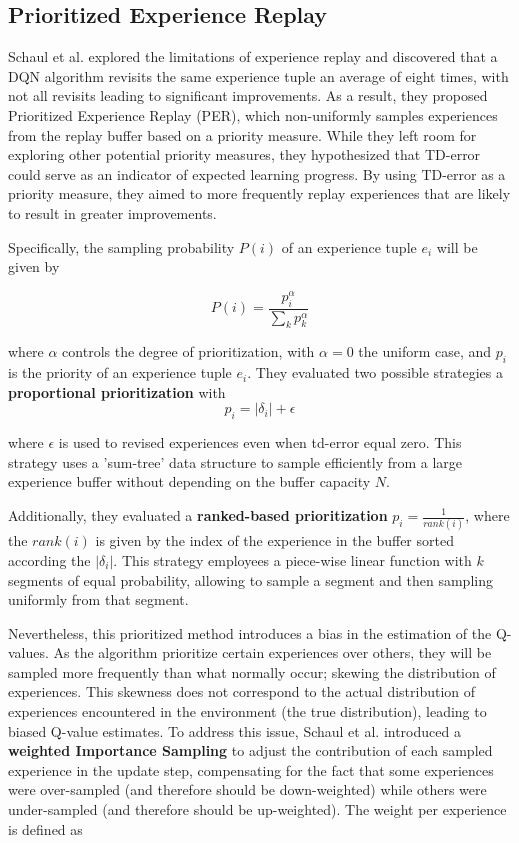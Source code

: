 \subsection{Prioritized Experience Replay}

Schaul et al. \cite{schaul2015prioritized} explored the limitations of experience replay and discovered that a DQN algorithm revisits the same experience tuple an average of eight times, with not all revisits leading to significant improvements. As a result, they proposed Prioritized Experience Replay (PER), which non-uniformly samples experiences from the replay buffer based on a priority measure. While they left room for exploring other potential priority measures, they hypothesized that TD-error could serve as an indicator of expected learning progress. By using TD-error as a priority measure, they aimed to more frequently replay experiences that are likely to result in greater improvements.

Specifically, the sampling probability $P(i)$ of an experience tuple $e_i$ will be given by

\begin{equation}
    P(i) = \frac{p_i^\alpha}{\sum_k p_k^\alpha}
\end{equation}

where $\alpha$ controls the degree of prioritization, with $\alpha = 0$ the uniform case, and $p_i$ is the priority of an experience tuple $e_i$. They evaluated two possible strategies a \textbf{proportional prioritization} with 
\begin{equation}
    p_i = | \delta_i | + \epsilon
\end{equation}

where $\epsilon$ is used to revised experiences even when td-error equal zero. This strategy uses a 'sum-tree' data structure to sample efficiently from a large experience buffer without depending on the buffer capacity $N$.

Additionally, they evaluated a \textbf{ranked-based prioritization} $p_i = \frac{1}{rank(i)}$, where the $rank(i)$ is given by the index of the experience in the buffer sorted according the $| \delta_i |$. This strategy employees a piece-wise linear function with $k$ segments of equal probability, allowing to sample a segment and then sampling uniformly from that segment.

Nevertheless, this prioritized method introduces a bias in the estimation of the Q-values. As the algorithm prioritize certain experiences over others, they will be sampled more frequently than what normally occur; skewing the distribution of experiences. This skewness does not correspond to the actual distribution of experiences encountered in the environment (the true distribution), leading to biased Q-value estimates. To address this issue, Schaul et al. \cite{schaul2015prioritized} introduced a \textbf{weighted Importance Sampling} \cite{mahmood2014weighted} to adjust the contribution of each sampled experience in the update step, compensating for the fact that some experiences were over-sampled (and therefore should be down-weighted) while others were under-sampled (and therefore should be up-weighted). The weight per experience is defined as

